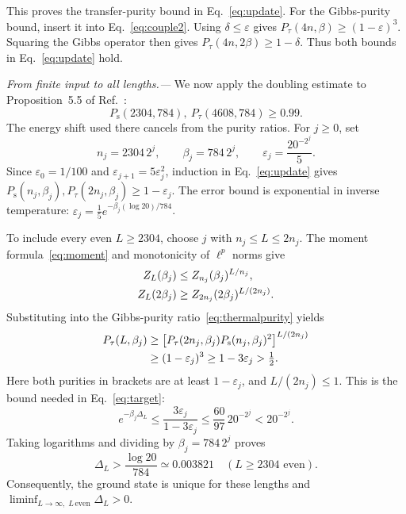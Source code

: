 \documentclass[aps,prl,reprint,amsmath,amssymb,nofootinbib,raggedbottom]{revtex4-2}
\newcommand{\Ps}{P_{\mathrm{s}}}
\newcommand{\Pt}{P_{\tau}}
\begin{document}
This proves the transfer-purity bound in Eq.~\eqref{eq:update}.
For the Gibbs-purity bound, insert it into Eq.~\eqref{eq:couple2}.
Using $\delta\le\varepsilon$ gives $\Pt(4n,\beta)\ge(1-\varepsilon)^3$.
Squaring the Gibbs operator then gives $\Pt(4n,2\beta)\ge1-\delta$.
Thus both bounds in Eq.~\eqref{eq:update} hold.

\emph{From finite input to all lengths.---}
We now apply the doubling estimate to Proposition~5.5 of
Ref.~\cite{source}:
\begin{equation}
 \Ps(2304,784),\ \Pt(4608,784)\ge0.99.
 \label{eq:input}
\end{equation}
The energy shift used there cancels from the purity ratios.
For $j\ge0$, set
\begin{equation}
 n_j=2304\,2^j,\qquad\beta_j=784\,2^j,\qquad
 \varepsilon_j=\frac{20^{-2^j}}5.
 \label{eq:scales}
\end{equation}
Since $\varepsilon_0=1/100$ and $\varepsilon_{j+1}=5\varepsilon_j^2$,
induction in Eq.~\eqref{eq:update} gives
$\Ps(n_j,\beta_j),\Pt(2n_j,\beta_j)\ge1-\varepsilon_j$.
The error bound is exponential in inverse temperature:
$\varepsilon_j=\frac15 e^{-\beta_j(\log20)/784}$.

To include every even $L\ge2304$, choose $j$ with $n_j\le L\le2n_j$.
The moment formula~\eqref{eq:moment} and monotonicity of $\ell^p$ norms give
\begin{align}
 Z_L(\beta_j)&\le Z_{n_j}(\beta_j)^{L/n_j},\notag\\
 Z_L(2\beta_j)&\ge Z_{2n_j}(2\beta_j)^{L/(2n_j)}.
 \label{eq:moments}
\end{align}
Substituting into the Gibbs-purity ratio~\eqref{eq:thermalpurity} yields
\begin{align}
 \Pt(L,\beta_j)
 &\ge\bigl[\Pt(2n_j,\beta_j)\Ps(n_j,\beta_j)^2\bigr]^{L/(2n_j)}\notag\\
 &\ge(1-\varepsilon_j)^3\ge1-3\varepsilon_j>\tfrac12.
 \label{eq:interpolate}
\end{align}
Here both purities in brackets are at least $1-\varepsilon_j$, and
$L/(2n_j)\le1$. This is the bound needed in Eq.~\eqref{eq:target}:
\begin{equation}
 e^{-\beta_j\Delta_L}
 \le\frac{3\varepsilon_j}{1-3\varepsilon_j}
 \le\frac{60}{97}\,20^{-2^j}<20^{-2^j}.
 \label{eq:gapratio}
\end{equation}
Taking logarithms and dividing by $\beta_j=784\,2^j$ proves
\begin{equation}
 \boxed{\Delta_L>\frac{\log20}{784}\simeq0.003821
 \quad(L\ge2304\text{ even}).}
 \label{eq:gap}
\end{equation}
Consequently, the ground state is unique for these lengths and
$\liminf_{L\to\infty,\;L\,\mathrm{even}}\Delta_L>0$.
\end{document}
